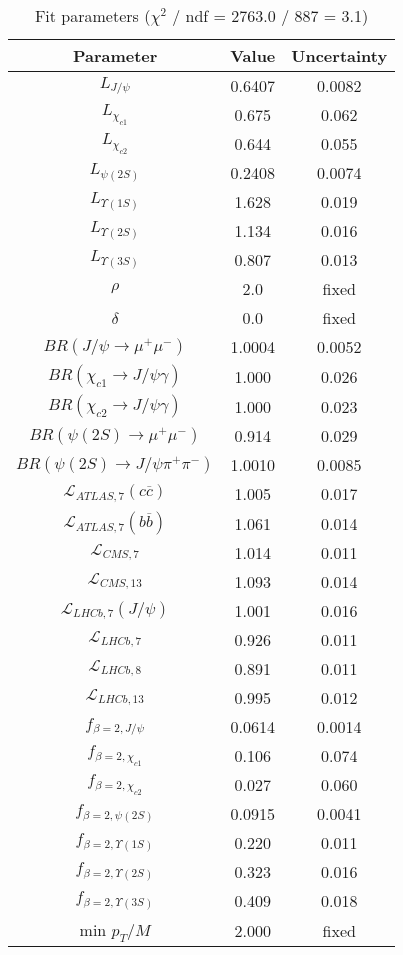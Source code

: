 \begin{table}[h!]
\centering
\begin{tabular}{c|c|c}
Parameter & Value & Uncertainty \\
\hline
$L_{J/\psi}$ & 0.6407 & 0.0082 \\
$L_{\chi_{c1}}$ & 0.675 & 0.062 \\
$L_{\chi_{c2}}$ & 0.644 & 0.055 \\
$L_{\psi(2S)}$ & 0.2408 & 0.0074 \\
$L_{\Upsilon(1S)}$ & 1.628 & 0.019 \\
$L_{\Upsilon(2S)}$ & 1.134 & 0.016 \\
$L_{\Upsilon(3S)}$ & 0.807 & 0.013 \\
$\rho$ & 2.0 & fixed \\
$\delta$ & 0.0 & fixed \\
$BR(J/\psi\rightarrow\mu^+\mu^-)$ & 1.0004 & 0.0052 \\
$BR(\chi_{c1}\rightarrow J/\psi\gamma)$ & 1.000 & 0.026 \\
$BR(\chi_{c2}\rightarrow J/\psi\gamma)$ & 1.000 & 0.023 \\
$BR(\psi(2S)\rightarrow\mu^+\mu^-)$ & 0.914 & 0.029 \\
$BR(\psi(2S)\rightarrow J/\psi\pi^+\pi^-)$ & 1.0010 & 0.0085 \\
$\mathcal L_{ATLAS,7}(c\overline c)$ & 1.005 & 0.017 \\
$\mathcal L_{ATLAS,7}(b\overline b)$ & 1.061 & 0.014 \\
$\mathcal L_{CMS,7}$ & 1.014 & 0.011 \\
$\mathcal L_{CMS,13}$ & 1.093 & 0.014 \\
$\mathcal L_{LHCb,7}(J/\psi)$ & 1.001 & 0.016 \\
$\mathcal L_{LHCb,7}$ & 0.926 & 0.011 \\
$\mathcal L_{LHCb,8}$ & 0.891 & 0.011 \\
$\mathcal L_{LHCb,13}$ & 0.995 & 0.012 \\
$f_{\beta=2,J/\psi}$ & 0.0614 & 0.0014 \\
$f_{\beta=2,\chi_{c1}}$ & 0.106 & 0.074 \\
$f_{\beta=2,\chi_{c2}}$ & 0.027 & 0.060 \\
$f_{\beta=2,\psi(2S)}$ & 0.0915 & 0.0041 \\
$f_{\beta=2,\Upsilon(1S)}$ & 0.220 & 0.011 \\
$f_{\beta=2,\Upsilon(2S)}$ & 0.323 & 0.016 \\
$f_{\beta=2,\Upsilon(3S)}$ & 0.409 & 0.018 \\
min $p_T/M$ & 2.000 & fixed \\
\end{tabular}
\caption{Fit parameters ($\chi^2$ / ndf = 2763.0 / 887 = 3.1)}
\end{table}
